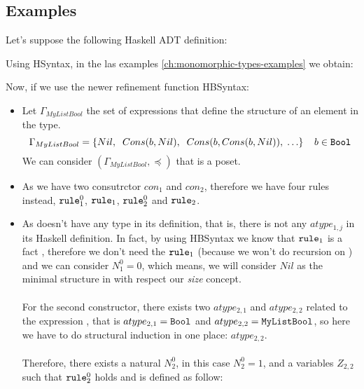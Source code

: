 	\subsection{Examples} \label{ch:monomorphic-bounded-types-examples}
	\begin{example}[MyListBool]
		Let's suppose the following Haskell ADT definition:
		
		Using HSyntax, in the las examples \ref{ch:monomorphic-types-examples} we obtain:
		
		Now, if we use the newer refinement function HBSyntax:
		\begin{itemize}
			\item Let $\Gamma_{MyListBool}$ the set of expressions that define the structure of an element in the  type. $$\Gamma_{MyListBool} = \{ Nil, \;\; Cons(b, Nil), \;\; Cons(b, Cons(b, Nil)), \; \ldots \} \;\; \;\; b \in \texttt{Bool}$$
			      We can consider $(\Gamma_{MyListBool}, \preceq)$ that is a poset.
			\item As we have two consutrctor $con_1$ and $con_2$, therefore we have four rules instead, $\texttt{rule}_{1}^{0}$, $\texttt{rule}_1$, $\texttt{rule}_{2}^{0}$ and $\texttt{rule}_2$.
			\item As  doesn't have any type in its definition, that is, there is not any $atype_{1,j}$ in its Haskell definition. In fact, by using HBSyntax we know that $\texttt{rule}_1$ is a fact , therefore we don't need the $\texttt{rule}_1$ (because we won't do recursion on ) and we can consider $N_{1}^{0} = 0$, which means, we will consider $Nil$ as the minimal structure in  with respect our \textit{size} concept.\\\\
			      For the second constructor, there exists two $atype_{2,1}$ and $atype_{2,2}$ related to the expression , that is $atype_{2,1} = \texttt{Bool}$ and $atype_{2,2} = \texttt{MyListBool}$, so here we have to do structural induction in one place: $atype_{2,2}$.\\\\
			      Therefore, there exists a natural $N_{2}^{0}$, in this case $N_{2}^{0} = 1$, and a variables $Z_{2,2}$ such that $\texttt{rule}_{2}^{0}$ holds and is defined as follow:
			      \begin{flalign*}

\end{flalign*}
\end{itemize}
\end{example}
